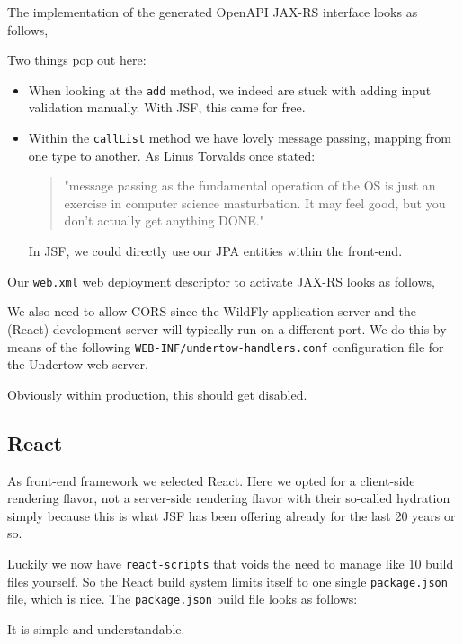 The implementation of the generated OpenAPI JAX-RS interface looks as follows,

Two things pop out here:
\begin{itemize}
	\item When looking at the \texttt{add} method, we indeed are stuck with adding input validation manually.
	With JSF, this came for free.
	\item Within the \texttt{callList} method we have lovely message passing, mapping from one type to another.
	As Linus Torvalds once stated:
	\begin{quote}
		"message passing as the fundamental operation of the OS is just an exercise in computer science masturbation.
		It may feel good, but you don’t actually get anything DONE."
	\end{quote}
	In JSF, we could directly use our JPA entities within the front-end.
\end{itemize}

Our \texttt{web.xml} web deployment descriptor to activate JAX-RS looks as follows,


We also need to allow CORS since the WildFly application server and the (React) development server will typically run on a different port.
We do this by means of the following \texttt{WEB-INF/undertow-handlers.conf} configuration file for the Undertow web server.

Obviously within production, this should get disabled.

\subsection{React}
As front-end framework we selected React.
Here we opted for a client-side rendering flavor, not a server-side rendering flavor with their so-called hydration simply because this is what JSF has been offering already for the last 20 years or so.

Luckily we now have \texttt{react-scripts} that voids the need to manage like 10 build files yourself.
So the React build system limits itself to one single \texttt{package.json} file, which is nice.
The \texttt{package.json} build file looks as follows:

It is simple and understandable.

